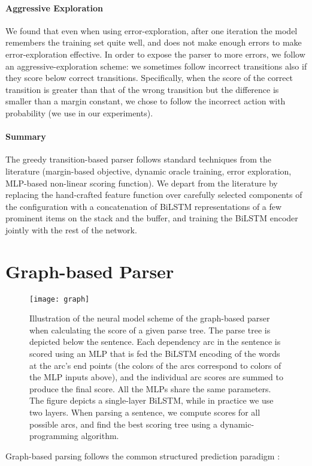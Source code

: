 \documentclass[11pt]{article}
\begin{document}
\paragraph{Aggressive Exploration} We found that even when using error-exploration, after one iteration the model
remembers the training set quite well, and does not make enough errors to make
error-exploration effective.  In order to expose the parser to more errors, we 
follow an aggressive-exploration scheme: we sometimes follow incorrect transitions also if
they score below correct transitions.  Specifically, when the score of the correct
transition is greater than that of the wrong transition but the difference is smaller
than a margin constant, we chose to follow the incorrect action with probability
 (we use  in our experiments).

\paragraph{Summary}
The greedy transition-based parser follows standard techniques from the
literature (margin-based objective, dynamic oracle training, error exploration,
MLP-based non-linear scoring function).
We depart from the literature by replacing the hand-crafted feature function
over carefully selected components of the configuration with a concatenation of
BiLSTM representations of a few prominent items on the stack and the
buffer, and training the \mbox{BiLSTM} encoder jointly with the rest of the network. 

\section{Graph-based Parser}
\begin{figure*}
\begin{center}
\texttt{[image: graph]}
\end{center}
\vspace*{-2em}
\caption{\small Illustration of the neural model scheme of the graph-based parser when calculating the score of a given parse tree.
The parse tree is depicted below the sentence. Each dependency arc in the sentence is scored using an MLP that is fed the \mbox{BiLSTM} encoding of the words at the arc's end points (the colors of the arcs correspond to colors of the MLP inputs above), and the individual arc scores are summed to produce the final score. All the MLPs share the same parameters. The figure depicts a single-layer BiLSTM, while in practice we use two layers. When parsing a sentence, we compute scores for all possible  arcs, and find the best scoring tree using a dynamic-programming algorithm.}
\label{fig:firstorder}
\end{figure*}
\label{sec:mst}
Graph-based parsing follows the common structured prediction paradigm
\cite{taskar2005learning,mst}:
\end{document}
